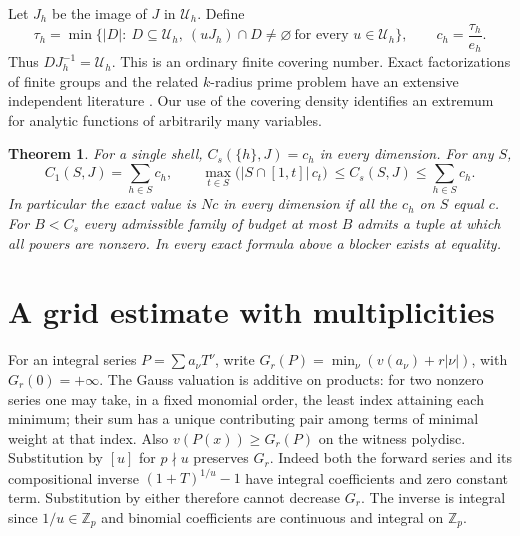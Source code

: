 \documentclass[11pt]{article}
\newtheorem{theorem}{Theorem}[section]
\theoremstyle{definition}\newtheorem{example}[theorem]{Example}
\newcommand{\Zp}{\mathbb Z_p}
\newcommand{\U}{\mathcal U}
\begin{document}
Let $J_h$ be the image of $J$ in $\U_h$. Define
\[
 \tau_h=\min\bigl\{|D|:\ D\subseteq\U_h,\ 
        (uJ_h)\cap D\ne\varnothing\ \text{for every }u\in\U_h\bigr\},
 \qquad c_h=\frac{\tau_h}{e_h}.
\]
Thus $D J_h^{-1}=\U_h$. This is an ordinary finite covering number. Exact
factorizations of finite groups and the related $k$-radius prime problem
have an extensive independent literature \cite{blackburn}.
Our use of the covering density identifies an extremum for analytic
functions of arbitrarily many variables.

\begin{theorem}\label{th:cover}
For a single shell, $C_s(\{h\},J)=c_h$ in every dimension. For any $S$,
\[
 C_1(S,J)=\sum_{h\in S} c_h,\qquad
 \max_{t\in S}\bigl(|S\cap[1,t]|\,c_t\bigr)\ \le C_s(S,J)\le
 \sum_{h\in S}c_h .
\]
In particular the exact value is $Nc$ in every dimension if all the $c_h$
on $S$ equal $c$. For $B<C_s$ every admissible family of budget at most $B$
admits a tuple at which all powers are nonzero. In every exact formula above
a blocker exists at equality.
\end{theorem}

\section{A grid estimate with multiplicities}
For an integral series $P=\sum a_\nu T^\nu$, write
$G_r(P)=\min_\nu(v(a_\nu)+r|\nu|)$, with $G_r(0)=+\infty$.
The Gauss valuation is additive on products: for two nonzero series one
may take, in a fixed monomial order, the least index attaining each minimum;
their sum has a unique contributing pair among terms of minimal weight at
that index. Also $v(P(x))\ge G_r(P)$ on the witness polydisc.
Substitution by $[u]$ for $p\nmid u$ preserves $G_r$. Indeed both the forward
series and its compositional inverse $(1+T)^{1/u}-1$ have integral
coefficients and zero constant term. Substitution by either therefore cannot
decrease $G_r$. The inverse is integral since $1/u\in\Zp$ and binomial
coefficients are continuous and integral on $\Zp$.
\end{document}
